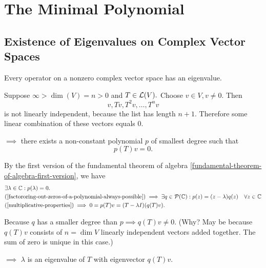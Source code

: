 \section{The Minimal Polynomial}
\subsection{Existence of Eigenvalues on Complex Vector Spaces}

\begin{thm} 
  \label{thm: existence of eigenvalues}
  Every operator on a \fd non\-zero complex vector space has an eigenvalue.
\end{thm}
\begin{prf}
  Suppose $\infty>\dim(V)=n>0$ and $T\in \mathcal{L}(V).$ Choose $v\in V, v\neq0$. Then
  \begin{equation}
    v, Tv, T^2v, \dots, T^nv
  \end{equation}
  is not linearly independent,
  because the list has length $n+1$. Therefore some linear combination of these vectors equals $0$.

  $\implies$ there exists a non-constant polynomial $p$ of smallest degree such that
  \begin{equation}
    p(T)v = 0.
  \end{equation}

  By the first version of the fundamental theorem of algebra \ref{fundamental-theorem-of-algebra-first-version}, we have
  \begin{equation}
    \begin{aligned}
      &\exists \lambda \in \mathbb{C}: p(\lambda) = 0. \\
      &\text{(\ref{factororing-out-zeros-of-a-polynomial-always-possible})}
      \implies \exists q \in \mathcal {P} (\mathbb{C}): p(z) = (z-\lambda)  q(z) \quad \forall z \in \mathbb{C} \\
      &\text{(\ref{multiplicative-properties})} \implies 0=p(T)v=(T-\lambda I) (q(T)v).
    \end{aligned}
  \end{equation}

  Because $q$ has a smaller degree than $p \implies q(T)v \neq 0$. (Why? May be because $q(T)v$ consists of $n=\dim V$ linearly independent vectors added together. The sum of zero is unique in this case.)

  $\implies$ $\lambda$ is an eigenvalue of $T$ with eigenvector $q(T)v$.
\end{prf}

